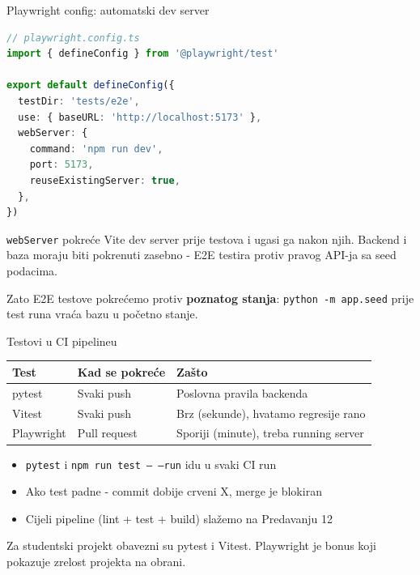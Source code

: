 \begin{frame}[fragile,shrink=5]{Playwright config: automatski dev server}
\begin{lstlisting}[language=typescript]
// playwright.config.ts
import { defineConfig } from '@playwright/test'

export default defineConfig({
  testDir: 'tests/e2e',
  use: { baseURL: 'http://localhost:5173' },
  webServer: {
    command: 'npm run dev',
    port: 5173,
    reuseExistingServer: true,
  },
})
\end{lstlisting}

\vspace{0.4em}
\texttt{webServer} pokreće Vite dev server prije testova i ugasi ga nakon njih. Backend i baza moraju biti pokrenuti zasebno - E2E testira protiv pravog API-ja sa seed podacima.

\vspace{0.4em}
Zato E2E testove pokrećemo protiv \textbf{poznatog stanja}: \texttt{python -m app.seed} prije test runa vraća bazu u početno stanje.
\end{frame}

\begin{frame}{Testovi u CI pipelineu}
\begin{tabular}{@{}lp{4cm}p{5cm}@{}}
  \toprule
  \textbf{Test} & \textbf{Kad se pokreće} & \textbf{Zašto} \\
  \midrule
  pytest & Svaki push & Poslovna pravila backenda \\
  Vitest & Svaki push & Brz (sekunde), hvatamo regresije rano \\
  Playwright & Pull request & Sporiji (minute), treba running server \\
  \bottomrule
\end{tabular}

\vspace{0.6em}
\begin{itemize}
  \item \texttt{pytest} i \texttt{npm run test -- --run} idu u svaki CI run
  \item Ako test padne - commit dobije crveni X, merge je blokiran
  \item Cijeli pipeline (lint + test + build) slažemo na Predavanju 12
\end{itemize}

\vspace{0.4em}
Za studentski projekt obavezni su pytest i Vitest. Playwright je bonus koji pokazuje zrelost projekta na obrani.
\end{frame}

